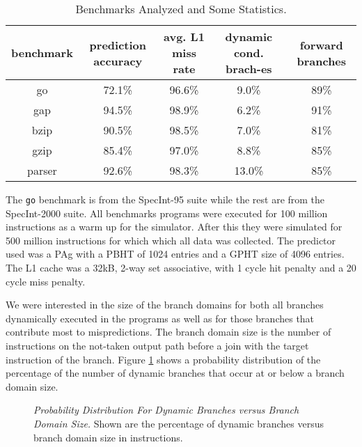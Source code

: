 \documentclass[10pt,dvips]{article}
\begin{document}
\begin{table}
\begin{center}
\caption{Benchmarks Analyzed and Some Statistics.}\label{tab:benches}
\begin{tabular}{|c|c|c|c|c|}
\hline 
benchmark&
prediction accuracy&
avg. L1 miss rate&
dynamic cond. brach-es & forward branches\\
\hline
\hline 
go&
72.1\%&
96.6\%&
9.0\% & 89\%\\
\hline 
gap&
94.5\%&
98.9\%&
6.2\% & 91\%\\
\hline 
bzip&
90.5\%&
98.5\%&
7.0\%&81\%\\
\hline 
gzip&
85.4\%&
97.0\%&
8.8\%&85\%\\
\hline 
parser&
92.6\%&
98.3\%&
13.0\%&85\%\\
\hline
\end{tabular}
\end{center}
\end{table}

The {\tt go} benchmark is from the SpecInt-95 suite while the rest
are from the SpecInt-2000 suite.
All benchmarks programs were executed for 100 million instructions
as a warm up for the simulator.  After this they were simulated
for 500 million instructions for which which all data was collected.
The predictor used was a PAg with
a PBHT of 1024 entries and a GPHT size of 4096 entries.
The L1 cache was a 32kB, 2-way set associative, with 1 cycle hit
penalty and a 20 cycle miss penalty.

We were interested
in the size of the branch domains for both all branches
dynamically executed in the programs as well as for those branches 
that contribute most to mispredictions.  The branch domain size
is the number of instructions on the not-taken output path
before a join with the target instruction of the branch.
Figure \ref{fig:numbranches} shows a probability distribution of
the percentage of the number of dynamic branches that occur at
or below a branch domain size.  

\begin{figure}
\vspace{0.2 in}
\setlength{\epsfxsize}{10cm}%
\centerline{}
\caption{{\em Probability Distribution For Dynamic Branches versus
Branch Domain Size.} 
Shown are the percentage of dynamic branches versus branch domain size
in instructions.}
\label{fig:numbranches}
\end{figure}
\end{document}

